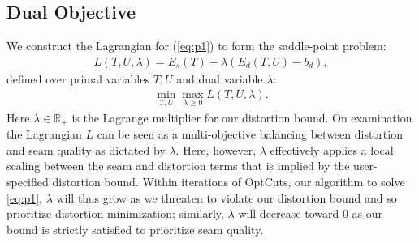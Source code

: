 %


\subsection{Dual Objective}
We construct the Lagrangian for (\ref{eq:p1}) to form the saddle-point problem: %
\begin{align}
	L(T,U,\lambda) = E_s(T) + \lambda(E_d(T,U) - b_d),
	\label{eq:L}
\end{align}
%
defined over primal variables $T,U$ and dual variable $\lambda$:
%
\begin{align}
	\min_{T,U} \max_{\lambda\geq0} L(T,U,\lambda).
	\label{eq:p2}
\end{align}
%
Here $\lambda \in \mathbb{R_+}$ is the Lagrange multiplier for our distortion bound. On examination the Lagrangian $L$ can be seen as a multi-objective balancing between distortion and seam quality as dictated by $\lambda$. Here, however, $\lambda$ effectively applies a local scaling between the seam and distortion terms that is implied %
by the user-specified distortion bound. Within iterations of OptCuts, our algorithm to solve \eqref{eq:p1}, $\lambda$ will thus grow as we threaten to violate our distortion bound and so prioritize distortion minimization; similarly, $\lambda$ will decrease toward $0$ as our bound is strictly satisfied to prioritize seam quality.


